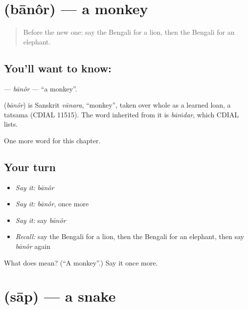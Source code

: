 \section[\texorpdfstring{\bn{বানর} (bānôr)}{বানর (bānôr)}]{ (bānôr) — a monkey}

\label{lesson:BN-C70-banor}



\begin{quote}
Before the new one: say the Bengali for a lion, then the Bengali for an elephant.
\end{quote}

\subsection*{You'll want to know: }
\textbf{} — \emph{bānôr} — \textquotedblleft{}a monkey\textquotedblright{}.

\begin{cousinweb}
\textbf{} (\emph{bānôr}) is Sanskrit \emph{vānara}, \textquotedblleft{}monkey\textquotedblright{}, taken over whole as a learned loan, a tatsama (CDIAL 11515). The word inherited from it is \emph{bāṁdar}, which CDIAL lists.
\end{cousinweb}

\begin{grammarlens}[title={What you've built}]
One more word for this chapter.
\end{grammarlens}

\subsection*{Your turn}
\begin{itemize}
\raggedright
  \item \emph{Say it:} \emph{bānôr}
  \item \emph{Say it:} \emph{bānôr}, once more
  \item \emph{Say it:} say \emph{bānôr}
  \item \emph{Recall:} say the Bengali for a lion, then the Bengali for an elephant, then say \emph{bānôr} again
\end{itemize}

\begin{tcolorbox}[breakable,colback=teal!4,colframe=teal!35!black,title={Before you move on}]
What does  mean? (\textquotedblleft{}A monkey\textquotedblright{}.) Say it once more.
\end{tcolorbox}
\section[\texorpdfstring{\bn{সাপ} (sāp)}{সাপ (sāp)}]{ (sāp) — a snake}

